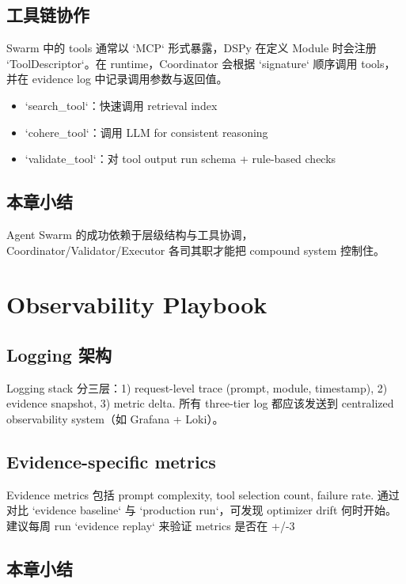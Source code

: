 \documentclass[a4paper]{article}
\begin{document}
\subsection{工具链协作}

Swarm 中的 tools 通常以 `MCP` 形式暴露，DSPy 在定义 Module 时会注册 `ToolDescriptor`。在 runtime，Coordinator 会根据 `signature` 顺序调用 tools，并在 evidence log 中记录调用参数与返回值。

\begin{itemize}
    \item `search\_tool`：快速调用 retrieval index
    \item `cohere\_tool`：调用 LLM for consistent reasoning
    \item `validate\_tool`：对 tool output run schema + rule-based checks
\end{itemize}

\subsection{本章小结}

Agent Swarm 的成功依赖于层级结构与工具协调，Coordinator/Validator/Executor 各司其职才能把 compound system 控制住。

\section{Observability Playbook}

\subsection{Logging 架构}

Logging stack 分三层：1) request-level trace (prompt, module, timestamp), 2) evidence snapshot, 3) metric delta. 所有 three-tier log 都应该发送到 centralized observability system（如 Grafana + Loki）。

\subsection{Evidence-specific metrics}

Evidence metrics 包括 prompt complexity, tool selection count, failure rate. 通过对比 `evidence baseline` 与 `production run`，可发现 optimizer drift 何时开始。建议每周 run `evidence replay` 来验证 metrics 是否在 +/-3%

\subsection{本章小结}
\end{document}
